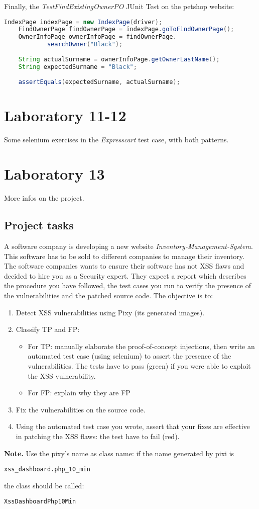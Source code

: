 \documentclass[a4paper, 10pt, titlepage]{article}
\begin{document}
Finally, the \textit{TestFindExistingOwnerPO} JUnit Test on the petshop website:
\begin{lstlisting}[language=java]
	IndexPage indexPage = new IndexPage(driver);
	FindOwnerPage findOwnerPage = indexPage.goToFindOwnerPage();
	OwnerInfoPage ownerInfoPage = findOwnerPage.
			searchOwner("Black");
		
	String actualSurname = ownerInfoPage.getOwnerLastName();
	String expectedSurname = "Black";
		
	assertEquals(expectedSurname, actualSurname);
\end{lstlisting}

\section{Laboratory 11-12}
Some selenium exercises in the \textit{Expresscart} test case, with both patterns.

\section{Laboratory 13}
More infos on the project.
\subsection*{Project tasks}
A software company is developing a new website \textit{Inventory-Management-System}. This software has to be sold to different companies to manage their inventory. The software companies wants to ensure their software has not XSS flaws and decided to hire you as a Security expert. They expect a report which describes the procedure you have followed, the test cases you run to verify the presence of the vulnerabilities and the patched source code. The objective is to:
\begin{enumerate}
\item Detect XSS vulnerabilities using Pixy (its generated images).
\item Classify TP and FP:
\begin{itemize}
\item For TP: manually elaborate the proof-of-concept injections, then write an automated test case (using selenium) to assert the presence of the vulnerabilities. The tests have to pass (green) if you were able to exploit the XSS vulnerability.
\item For FP: explain why they are FP
\end{itemize}
\item Fix the vulnerabilities on the source code.
\item Using the automated test case you wrote, assert that your fixes are effective in patching the XSS flaws: the test have to fail (red).
\end{enumerate}
\textbf{Note.} Use the pixy's name as class name: if the name generated by pixi is
\begin{verbatim}
xss_dashboard.php_10_min
\end{verbatim}
the class should be called:
\begin{verbatim}
XssDashboardPhp10Min
\end{verbatim}
\end{document}
